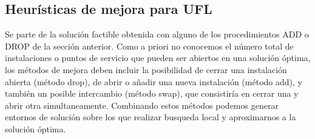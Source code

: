 \subsection{Heurísticas de mejora para UFL}

Se parte de la solución factible obtenida con alguno de los procedimientos ADD o DROP de la sección anterior. Como a priori no
conocemos el número total de instalaciones o puntos de servicio que pueden ser abiertos en una solución óptima, los métodos de
mejora deben incluir la posibilidad de cerrar una instalación abierta (método drop), de abrir o añadir una nueva instalación
(método add), y también un posible intercambio (método swap), que consistiría en cerrar una y abrir otra simultaneamente.
Combinando estos métodos podemos generar entornos de solución sobre los que realizar busqueda local y aproximarnos a la
solución óptima.